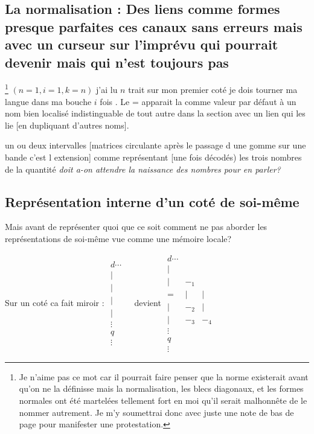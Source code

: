 \documentclass{article}
\begin{document}
\subsection{La normalisation :  Des liens comme formes presque parfaites ces canaux sans erreurs mais avec un curseur sur l'imprévu qui pourrait devenir mais qui n'est toujours pas}\footnote{Je n'aime pas ce mot car il pourrait faire penser que la norme existerait avant qu'on ne la définisse mais la normalisation,  les blecs diagonaux, et les formes normales ont été martelées tellement fort en moi qu'il serait malhonnête de le nommer autrement. Je m'y soumettrai donc avec juste une note de bas de page pour manifester une protestation.}
$(n=1,i=1,k=n)$ j'ai lu $n$ trait sur mon premier coté je dois tourner ma langue dans ma bouche $i$ fois . Le = apparait la comme valeur par défaut à un nom bien localisé indistinguable de tout autre dans la section avec un lien qui les lie [en dupliquant d'autres noms].

un ou deux intervalles [matrices circulante après le passage d une gomme sur une bande c'est l extension]
comme représentant [une fois décodés) les trois nombres de la quantité \emph{doit a-on attendre la naissance des nombres pour en parler?}

\subsection{Représentation interne d'un coté de soi-même}
Mais avant de représenter quoi que ce soit comment ne pas aborder les représentations de soi-même vue comme une mémoire locale?

Sur un coté ca fait miroir :
${\scriptscriptstyle
\begin{array}{cc} 
d \cdots \\
|& \\
|& \\
|& \\
|& \\
\vdots &\\
q&\\
\vdots&
\end{array} 
}$
 devient ${\scriptscriptstyle
\begin{array}{ccc} 
d \cdots \\
|& \\
|& -_1\\
=&|&|\\
|& -_2&|\\
|& -_3&-_4\\
\vdots &\\
q&\\
\vdots&
\end{array} 
}$ 
\end{document}
